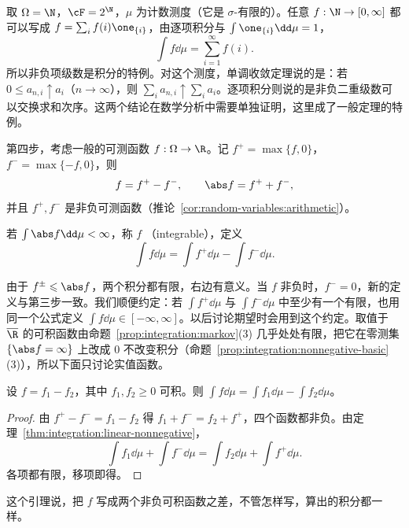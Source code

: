 \begin{example}[计数测度与级数]
取 $\Omega=\N$，$\cF=2^\N$，$\mu$ 为计数测度（它是 $\sigma$-有限的）。任意 $f:\N\to[0,\infty]$ 都可以写成 $f=\sum_if(i)\one_{\{i\}}$，由逐项积分与 $\int\one_{\{i\}}\dd\mu=1$，
\[
\int f\dd\mu=\sum_{i=1}^\infty f(i).
\]
所以非负项级数是积分的特例。对这个测度，单调收敛定理说的是：若 $0\leqslant a_{n,i}\uparrow a_i$（$n\to\infty$），则 $\sum_ia_{n,i}\uparrow\sum_ia_i$。逐项积分则说的是非负二重级数可以交换求和次序。这两个结论在数学分析中需要单独证明，这里成了一般定理的特例。
\end{example}


第四步，考虑一般的可测函数 $f:\Omega\to\R$。记 $f^+=\max\{f,0\}$，$f^-=\max\{-f,0\}$，则
\[
f=f^+-f^-,\qquad\abs f=f^++f^-,
\]
并且 $f^+,f^-$ 是非负可测函数（推论~\ref{cor:random-variables:arithmetic}）。

\begin{definition}[可积函数]\label{def:integration:integrable}
若 $\int\abs f\dd\mu<\infty$，称 $f$ （integrable），定义
\[
\int f\dd\mu=\int f^+\dd\mu-\int f^-\dd\mu .
\]
\end{definition}

由于 $f^\pm\leqslant\abs f$，两个积分都有限，右边有意义。当 $f$ 非负时，$f^-=0$，新的定义与第三步一致。我们顺便约定：若 $\int f^+\dd\mu$ 与 $\int f^-\dd\mu$ 中至少有一个有限，也用同一个公式定义 $\int f\dd\mu\in[-\infty,\infty]$。以后讨论期望时会用到这个约定。取值于 $\overline\R$ 的可积函数由命题~\ref{prop:integration:markov}(3) 几乎处处有限，把它在零测集 $\{\abs f=\infty\}$ 上改成 $0$ 不改变积分（命题~\ref{prop:integration:nonnegative-basic}(3)），所以下面只讨论实值函数。

\begin{lemma}\label{lem:integration:difference}
设 $f=f_1-f_2$，其中 $f_1,f_2\geqslant0$ 可积。则 $\int f\dd\mu=\int f_1\dd\mu-\int f_2\dd\mu$。
\end{lemma}
\begin{proof}
由 $f^+-f^-=f_1-f_2$ 得 $f_1+f^-=f_2+f^+$，四个函数都非负。由定理~\ref{thm:integration:linear-nonnegative}，
\[
\int f_1\dd\mu+\int f^-\dd\mu=\int f_2\dd\mu+\int f^+\dd\mu .
\]
各项都有限，移项即得。
\end{proof}

这个引理说，把 $f$ 写成两个非负可积函数之差，不管怎样写，算出的积分都一样。

